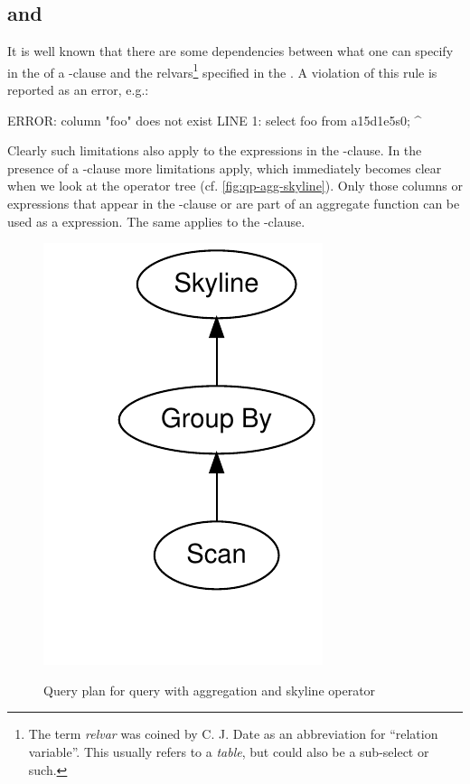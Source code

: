 \subsection{ and }
It is well known that there are some dependencies between what one can
specify in the  of a -clause and
the relvars\footnote{The term \emph{relvar} was coined by C. J. Date
as an abbreviation for ``relation variable''.  This usually refers to
a \emph{table}, but could also be a sub-select or such.} specified
in the .  A violation of this rule is reported as an
error, e.g.:

\begin{interactive}
ERROR:  column "foo" does not exist
LINE 1: select foo from a15d1e5s0;
               ^
\end{interactive}

\noindent
Clearly such limitations also apply to the expressions in the
-clause.  In the presence of a
-clause more limitations apply, which immediately
becomes clear when we look at the operator tree
(cf. \autoref{fig:qp-agg-skyline}).  Only those columns or expressions
that appear in the -clause or are part of an
aggregate function can be used as a  expression.
The same applies to the -clause.

\begin{figure}[htbp]
\centering
\includegraphics[scale=0.5]{plots-qp/qp-agg-skyline}\\
\caption{Query plan for query with aggregation and skyline operator}
\label{fig:qp-agg-skyline}
\end{figure}

